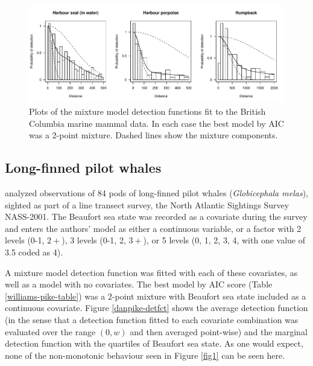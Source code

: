 \documentclass[useAMS,referee,usenatbib]{biom}
\begin{document}
\begin{figure}
\centering
\includegraphics[width=\textwidth]{analyses/williamsplots.pdf}
\caption{Plots of the mixture model detection functions fit to the British Columbia marine mammal data. In each case the best model by AIC was a 2-point mixture. Dashed lines show the mixture components.}
\label{williams-detfcts}
\end{figure}

\subsection{Long-finned pilot whales}

\cite{Pike:2003ug} analyzed observations of 84 pods of long-finned pilot whales (\textit{Globicephala melas}), sighted as part of a line transect survey, the North Atlantic Sightings Survey NASS-2001. The Beaufort sea state was recorded as a covariate during the survey and enters the authors' model as either a continuous variable, or a factor with 2 levels (0-1, $2+$), 3 levels (0-1, 2, $3+$), or 5 levels (0, 1, 2, 3, 4, with one value of 3.5 coded as 4).

A mixture model detection function was fitted with each of these covariates, as well as a model with no covariates.  The best model by AIC score (Table \ref{williams-pike-table}) was a 2-point mixture with Beaufort sea state included as a continuous covariate. Figure \ref{danpike-detfct} shows the average detection function (in the sense that a detection function fitted to each covariate combination was evaluated over the range $(0,w)$ and then averaged point-wise) and the marginal detection function with the quartiles of Beaufort sea state. As one would expect, none of the non-monotonic behaviour seen in Figure \ref{fig1} can be seen here.
\end{document}
